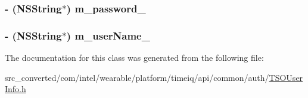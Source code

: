 \subsubsection[{m\+\_\+password\+\_\+}]{\setlength{\rightskip}{0pt plus 5cm}-\/ (N\+S\+String$\ast$) m\+\_\+password\+\_\+}\label{interface_t_s_o_user_info_ab83e5fcd66f881b28e2b846291517ad2}
\hypertarget{interface_t_s_o_user_info_afe8cb62c29a17cbe4fa813c42a09d161}{}
\subsubsection[{m\+\_\+user\+Name\+\_\+}]{\setlength{\rightskip}{0pt plus 5cm}-\/ (N\+S\+String$\ast$) m\+\_\+user\+Name\+\_\+}\label{interface_t_s_o_user_info_afe8cb62c29a17cbe4fa813c42a09d161}


The documentation for this class was generated from the following file\+:\begin{DoxyCompactItemize}
\item 
src\+\_\+converted/com/intel/wearable/platform/timeiq/api/common/auth/\hyperlink{_t_s_o_user_info_8h}{T\+S\+O\+User\+Info.\+h}\end{DoxyCompactItemize}

